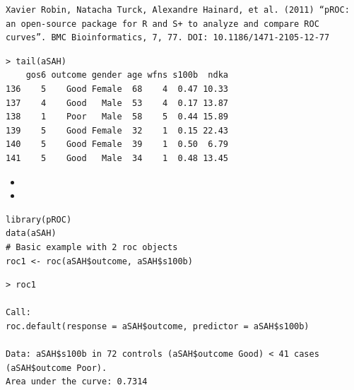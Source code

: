 \documentclass[caret-main.tex]{subfiles}
\begin{document}
\begin{verbatim}
Xavier Robin, Natacha Turck, Alexandre Hainard, et al. (2011) “pROC: an open-source package for R and S+ to analyze and compare ROC curves”. BMC Bioinformatics, 7, 77. DOI: 10.1186/1471-2105-12-77
\end{verbatim}

\begin{verbatim}
> tail(aSAH)
    gos6 outcome gender age wfns s100b  ndka
136    5    Good Female  68    4  0.47 10.33
137    4    Good   Male  53    4  0.17 13.87
138    1    Poor   Male  58    5  0.44 15.89
139    5    Good Female  32    1  0.15 22.43
140    5    Good Female  39    1  0.50  6.79
141    5    Good   Male  34    1  0.48 13.45
\end{verbatim}
\begin{itemize}
\item
\item
\end{itemize}
\begin{framed}
\begin{verbatim}
library(pROC)
data(aSAH)
# Basic example with 2 roc objects
roc1 <- roc(aSAH$outcome, aSAH$s100b)
\end{verbatim}
\end{framed}

\begin{verbatim}
> roc1

Call:
roc.default(response = aSAH$outcome, predictor = aSAH$s100b)

Data: aSAH$s100b in 72 controls (aSAH$outcome Good) < 41 cases (aSAH$outcome Poor).
Area under the curve: 0.7314

\end{verbatim}


\end{document}
